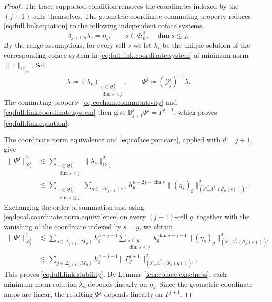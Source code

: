 \documentclass[a4paper,11pt]{article}
\theoremstyle{definition}
\newcommand{\Mh}{\mathcal{M}_h}
\newcommand{\Sh}{\mathcal{S}_h}
\newcommand{\FM}[1]{\Delta_{#1}}
\newcommand{\cof}[1]{\operatorname{cof}_{#1}}
\newcommand{\PLtrim}[2]{\mathcal{P}_{#1}^{-}\Lambda^{#2}}
\newcommand{\PLtrimz}[2]{\mathring{\mathcal P}_{#1}^{-}\Lambda^{#2}}
\begin{document}
\begin{proof}
The trace-supported condition removes the coordinates indexed by the $(j+1)$-cells themselves.
The geometric-coordinate commuting property reduces \eqref{eq:full.link.equation} to the following independent coface systems.
\begin{equation}\label{eq:full.link.coordinate.system}
  \delta_{j+1,s}\lambda_s=\eta_s,
  \qquad
  s\in\mathfrak S_h^j,\quad
  \dim s\leq j.
\end{equation}
By the range assumptions, for every cell $s$ we let $\lambda_s$ be the unique solution of the corresponding coface system in \eqref{eq:full.link.coordinate.system} of minimum norm $\|\cdot\|_{\mathbb C_{j,s}^j}$.
Set
\[
  \lambda
  \coloneqq
  (\lambda_s)_{\substack{
    s\in\mathfrak S_h^j\\
    \dim s\leq j
  }},
  \qquad
  \Psi^j
  \coloneqq
  (\mathcal G_j^j)^{-1}\lambda.
\]
The commuting property \eqref{eq:cochain.commutativity} and \eqref{eq:full.link.coordinate.system} then give $\mathbb B_{j+1}^j\Psi^j = \Gamma^{j+1}$, which proves \eqref{eq:full.link.equation}.

The coordinate norm equivalence and \eqref{eq:coface.poincare}, applied with $d=j+1$, give
\[
\begin{aligned}
  \|\Psi^j\|_{\mathbb X_j^j}^2
  &\lesssim
  \sum_{\substack{
    s\in\mathfrak S_h^j\\
    \dim s\leq j
  }}
  \|\lambda_s\|_{\mathbb C_{j,s}^j}^2
  \\
  &\lesssim
  \sum_{\substack{
    s\in\mathfrak S_h^j\\
    \dim s\leq j
  }}
  \sum_{g\in\cof{j+1}(s)}
  h_g^{n-2j+\dim s}
  \|(\eta_s)_g\|_{
    \left(
      \PLtrimz{m}{q_j}(\Sh(s))
    \right)'
  }^2.
\end{aligned}
\]
Exchanging the order of summation and using \eqref{eq:local.coordinate.norm.equivalence} on every $(j+1)$-cell $g$, together with the vanishing of the coordinate indexed by $s=g$, we obtain
\[
\begin{aligned}
  \|\Psi^j\|_{\mathbb X_j^j}^2
  &\lesssim
  \sum_{g\in\FM{j+1}(\Mh)}
  h_g^{n-j+1}
  \sum_{\substack{
    s\subset g\\
    \dim s\leq j
  }}
  h_g^{\dim s-j-1}
  \|(\eta_s)_g\|_{
    \left(
      \PLtrimz{m}{q_j}(\Sh(s))
    \right)'
  }^2
  \\
  &\lesssim
  \sum_{g\in\FM{j+1}(\Mh)}
  h_g^{n-j+1}
  \|\Gamma_g^{j+1}\|_{
    \left(
      \PLtrim{m}{q_j}(\Sh(g))
    \right)'
  }^2.
\end{aligned}
\]
This proves \eqref{eq:full.link.stability}.
By Lemma~\ref{lem:coface.exactness}, each minimum-norm solution $\lambda_s$ depends linearly on $\eta_s$.
Since the geometric coordinate maps are linear, the resulting $\Psi^j$ depends linearly on $\Gamma^{j+1}$.


\end{proof}
\end{document}
